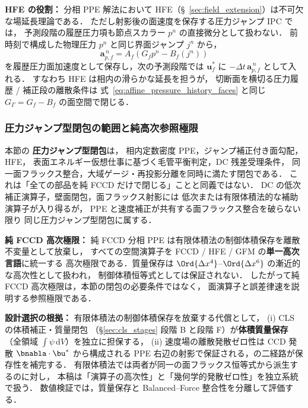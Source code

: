 \noindent\textbf{HFE の役割：}
分相 PPE 解法において HFE（§~\ref{sec:field_extension}）は不可欠な場延長理論である．
ただし射影後の面速度を保存する圧力ジャンプ IPC では，
予測段階の履歴圧力項も節点スカラー $p^n$ の直接微分として扱わない．
前時刻で構成した物理圧力 $p^n$ と同じ界面ジャンプ $j^n$ から，
\begin{equation}
  \label{eq:affine_pressure_history_faces}
  \mathbf{a}^{\,n}_{p,f}
  =
  A_f\left(G_f p^n - B_f(j^n)\right)
\end{equation}
を履歴圧力面加速度として保存し，次の予測段階では
$\mathbf{u}^{*}_f$ に $-\Delta t\,\mathbf{a}^{\,n}_{p,f}$ として入れる．
すなわち HFE は相内の滑らかな延長を担うが，
切断面を横切る圧力履歴 / 補正段の離散条件は
式~\eqref{eq:affine_pressure_history_faces} と同じ
$G_\Gamma=G_f-B_f$ の面空間で閉じる．

\subsubsection{圧力ジャンプ型閉包の範囲と純高次参照極限}
\label{sec:pure_fccd_split_ppe}

本節の \textbf{圧力ジャンプ型閉包}は，
相内定数密度 PPE，ジャンプ補正付き面勾配，HFE，
表面エネルギー仮想仕事に基づく毛管平衡判定，DC 残差受理条件，
同一面フラックス整合，大域ゲージ・再投影分離を同時に満たす閉包である．
これは「全ての部品を純 FCCD だけで閉じる」ことと同義ではない．
DC の低次補正演算子，壁面閉包，面フラックス射影には
低次または有限体積法的な補助演算子が入り得るが，
PPE と速度補正が共有する面フラックス整合を破らない限り
同じ圧力ジャンプ型閉包に属する．

\noindent\textbf{純 FCCD 高次極限：}
純 FCCD 分相 PPE は有限体積法の制御体積保存を離散不変量として放棄し，
すべての空間演算子を FCCD / HFE / GFM の\textbf{単一高次言語}に統一する
高次極限である．質量保存は
$\Ord{\Delta x^4}$--$\Ord{\Delta x^6}$ の漸近的な高次性として扱われ，
制御体積恒等式としては保証されない．
したがって純 FCCD 高次極限は，本節の閉包の必要条件ではなく，
面演算子と誤差律速を説明する参照極限である．

\noindent\textbf{設計選択の根拠：}
有限体積法の制御体積保存を放棄する代償として，
(i) CLS の体積補正・質量閉包
（§\ref{sec:cls_stages} 段階 B と段階 F）が\textbf{体積質量保存}
（全領域 $\int\psi\,\mathrm{d}V$）を独立に担保する，
(ii) 速度場の離散発散ゼロ性は CCD 発散 $\bnabla\cdot\bu^*$ から構成される
PPE 右辺の射影で保証される，の二経路が保存性を補完する．
有限体積法では両者が同一の面フラックス恒等式から派生するのに対し，
本稿は「演算子の高次性」と「幾何学的発散ゼロ性」を独立系統で扱う．
数値検証では，質量保存と Balanced--Force 整合性を分離して評価する．

